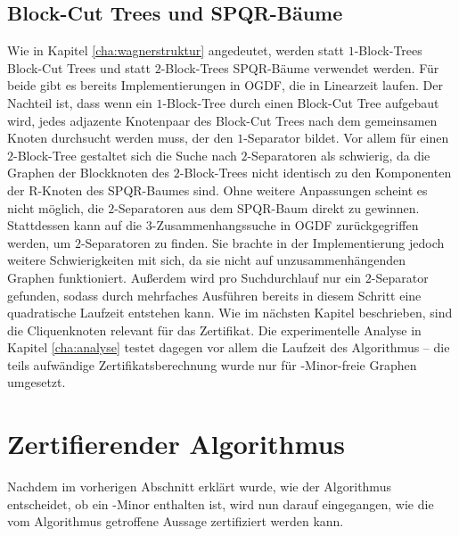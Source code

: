 \subsection{Block-Cut Trees und SPQR-Bäume}
Wie in Kapitel \ref{cha:wagnerstruktur} angedeutet, werden statt $1$-Block-Trees Block-Cut Trees und statt $2$-Block-Trees SPQR-Bäume verwendet werden.
Für beide gibt es bereits Implementierungen in OGDF, die in Linearzeit laufen.
Der Nachteil ist, dass wenn ein $1$-Block-Tree durch einen Block-Cut Tree aufgebaut wird, jedes adjazente Knotenpaar des Block-Cut Trees nach dem gemeinsamen Knoten durchsucht werden muss, der den $1$-Separator bildet.
Vor allem für einen $2$-Block-Tree gestaltet sich die Suche nach $2$-Separatoren als schwierig, da die Graphen der Blockknoten des $2$-Block-Trees nicht identisch zu den Komponenten der R-Knoten des SPQR-Baumes sind.
Ohne weitere Anpassungen scheint es nicht möglich, die $2$-Separatoren aus dem SPQR-Baum direkt zu gewinnen.
Stattdessen kann auf die $3$-Zusammenhangssuche in OGDF zurückgegriffen werden, um $2$-Separatoren zu finden.
Sie brachte in der Implementierung jedoch weitere Schwierigkeiten mit sich, da sie nicht auf unzusammenhängenden Graphen funktioniert.
Außerdem wird pro Suchdurchlauf nur ein $2$-Separator gefunden, sodass durch mehrfaches Ausführen bereits in diesem Schritt eine quadratische Laufzeit entstehen kann.
Wie im nächsten Kapitel beschrieben, sind die Cliquenknoten relevant für das Zertifikat.
Die experimentelle Analyse in Kapitel \ref{cha:analyse} testet dagegen vor allem die Laufzeit des Algorithmus -- die teils aufwändige Zertifikatsberechnung wurde nur für \kf-Minor-freie Graphen umgesetzt.


\section{Zertifierender Algorithmus}
Nachdem im vorherigen Abschnitt erklärt wurde, wie der Algorithmus entscheidet, ob ein \kf-Minor enthalten ist, wird nun darauf eingegangen, wie die vom Algorithmus getroffene Aussage zertifiziert werden kann.

